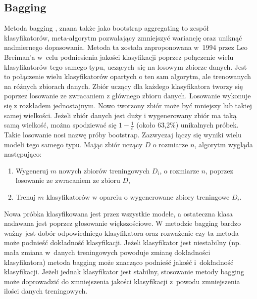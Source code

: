\subsection{Bagging}
Metoda bagging \cite{baggingc}, znana także jako bootstrap aggregating to zespół klasyfikatorów, meta-algorytm pozwalający zmniejszyć wariancję oraz uniknąć nadmiernego dopasowania. Metoda ta została zaproponowana w 1994 przez Leo Breiman’a w celu podniesienia jakości klasyfikacji poprzez połączenie wielu klasyfikatorów tego samego typu, uczących się na losowym zbiorze danych. Jest to połączenie wielu klasyfikatorów opartych o ten sam algorytm, ale trenowanych na różnych zbiorach danych. Zbiór uczący dla każdego klasyfikatora tworzy się poprzez losowanie ze zwracaniem z głównego zbioru danych. Losowanie wykonuje się z rozkładem jednostajnym. Nowo tworzony zbiór może być mniejszy lub takiej samej wielkości. Jeżeli zbiór danych jest duży i wygenerowany zbiór ma taką samą wielkość, można spodziewać się $1-\frac{1}{e}$ (około 63,2\%) unikalnych próbek. Takie losowanie nosi nazwę próby bootstrap. Zazwyczaj łączy się wyniki wielu modeli tego samego typu. Mając zbiór uczący $D$ o rozmiarze $n$, algorytm wygląda następująco:
\begin{enumerate}
	\item Wygeneruj $m$ nowych zbiorów treningowych $D_i$, o rozmiarze $n$, poprzez losowanie ze zwracaniem ze zbioru $D$,
	\item Trenuj $m$ klasyfikatorów w oparciu o wygenerowane zbiory treningowe $D_i$.	
\end{enumerate}
Nowa próbka klasyfikowana jest przez wszystkie modele, a ostateczna klasa nadawana jest poprzez głosowanie większościowe.
W metodzie bagging bardzo ważny jest dobór odpowiedniego klasyfikatora oraz rozważenie czy ta metoda może podnieść dokładność klasyfikacji. Jeżeli klasyfikator jest niestabilny (np. mała zmiana w danych treningowych powoduje zmianę dokładności klasyfikatora) metoda bagging może znacząco podnieść jakość i dokładność klasyfikacji. Jeżeli jednak klasyfikator jest stabilny, stosowanie metody bagging może doprowadzić do zmniejszenia jakości klasyfikacji z powodu zmniejszenia ilości danych treningowych.

